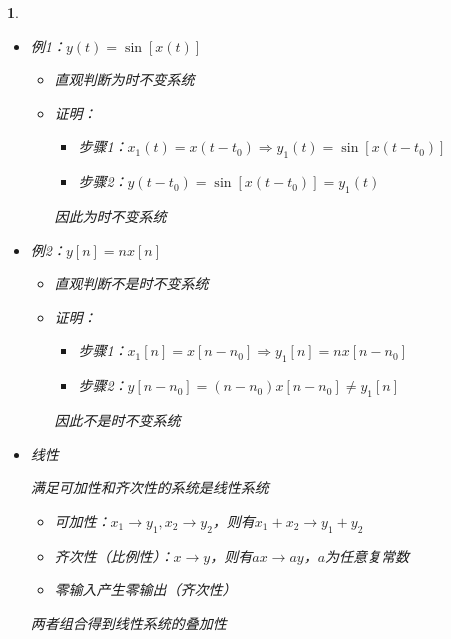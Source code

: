 \documentclass[UTF8]{report}
\theoremstyle{MyLineTheoremStyle} %
\theoremstyle{MyBlockTheoremStyle} %
\theoremstyle{MySubsubsectionStyle} %
\newtheorem{definition}{}
\begin{document}
\begin{definition}
\begin{itemize}
        判断一个系统是否时不变方法：
        \begin{itemize}
            \item 直观判断方法: 若$y(\cdot)$前出现变系数、或有反转、展缩变换，则系统为时变系统
            \item 一般性步骤：
            \begin{enumerate}
                \item 令输入为$x_1(t) = x(t - t_0)$，得到输出为$y_1(t)$
                \item 如果$y(t - t_0)$与$y_1(t)$相同，则为时不变系统
            \end{enumerate}
        \end{itemize}

        \item 例1：$y(t) = \sin[x(t)]$
    \begin{itemize}
        \item 直观判断为时不变系统
        \item 证明：
        \begin{itemize}
            \item 步骤1：$x_1(t) = x(t - t_0) \Rightarrow y_1(t) = \sin[x(t - t_0)]$
            \item 步骤2：$y(t - t_0) = \sin[x(t - t_0)] = y_1(t)$
        \end{itemize}
        因此为时不变系统
    \end{itemize}

    \item 例2：$y[n] = nx[n]$
        \begin{itemize}
            \item 直观判断不是时不变系统
            \item 证明：
            \begin{itemize}
                \item 步骤1：$x_1[n] = x[n - n_0] \Rightarrow y_1[n] = nx[n - n_0]$
                \item 步骤2：$y[n - n_0] = (n - n_0)x[n - n_0] \neq y_1[n]$
            \end{itemize}
            因此不是时不变系统
        \end{itemize}

        \item 线性\par
        满足可加性和齐次性的系统是线性系统
        \begin{itemize}
            \item 可加性：$x_1 \rightarrow y_1, x_2 \rightarrow y_2$，则有$x_1 + x_2 \rightarrow y_1 + y_2$
            \item 齐次性（比例性）：$x \rightarrow y$，则有$ax \rightarrow ay$，$a$为任意复常数
            \item 零输入产生零输出（齐次性）
        \end{itemize}
        两者组合得到线性系统的叠加性


\end{itemize}
\end{definition}
\end{document}
